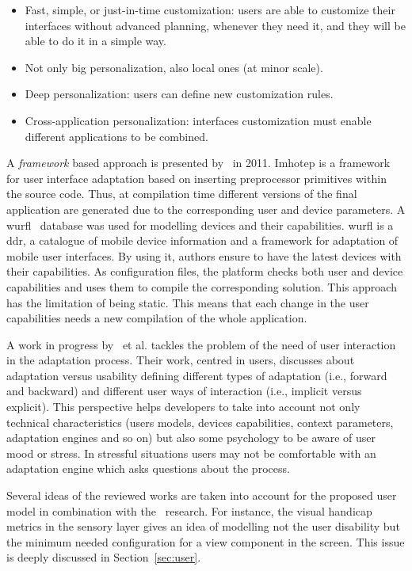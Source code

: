 \begin{itemize}
  \item Fast, simple, or just-in-time customization: users are able to customize
  their interfaces without advanced planning, whenever they need it, and they will
  be able to do it in a simple way.
  \item Not only big personalization, also local ones (at minor scale).
  \item Deep personalization: users can define new customization rules.
  \item Cross-application personalization: interfaces customization must enable 
  different applications to be combined.
\end{itemize}

A \textit{framework} based approach is presented by~\citet{almeida_imhotep_2011}
in 2011. Imhotep is a framework for user interface adaptation based on inserting
preprocessor primitives within the source code. Thus, at compilation time
different versions of the final application are generated due to the corresponding
user and device parameters. A \ac{wurfl}~\citep{wurfl} database was used for modelling
devices and their capabilities. \ac{wurfl} is a \ac{ddr}, a catalogue of mobile 
device information and a framework for adaptation of mobile user interfaces.
By using it, authors ensure to have the latest devices with their capabilities.
As configuration files, the platform checks both user and device capabilities and
uses them to compile the corresponding solution. This approach has the limitation
of being static. This means that each change in the user capabilities needs a new
compilation of the whole application.

A work in progress by~\citet{evers_achieving_2012} et al. tackles the problem of
the need of user interaction in the adaptation process. Their work, centred in
users, discusses about adaptation versus usability defining different types of
adaptation (i.e., forward and backward) and different user ways of interaction
(i.e., implicit versus explicit). This perspective helps developers to take into
account not only technical characteristics (users models, devices capabilities,
context parameters, adaptation engines and so on) but also some psychology to be 
aware of user mood or stress. In stressful situations users may not be comfortable 
with an adaptation engine which asks questions about the process.

Several ideas of the reviewed works are taken into account for the proposed user 
model in combination with the~\citet{casas_user_2008} research. For instance,
the visual handicap metrics in the sensory layer gives an idea of modelling
not the user disability but the minimum needed configuration for a view component
in the screen. This issue is deeply discussed in Section~\ref{sec:user}.

